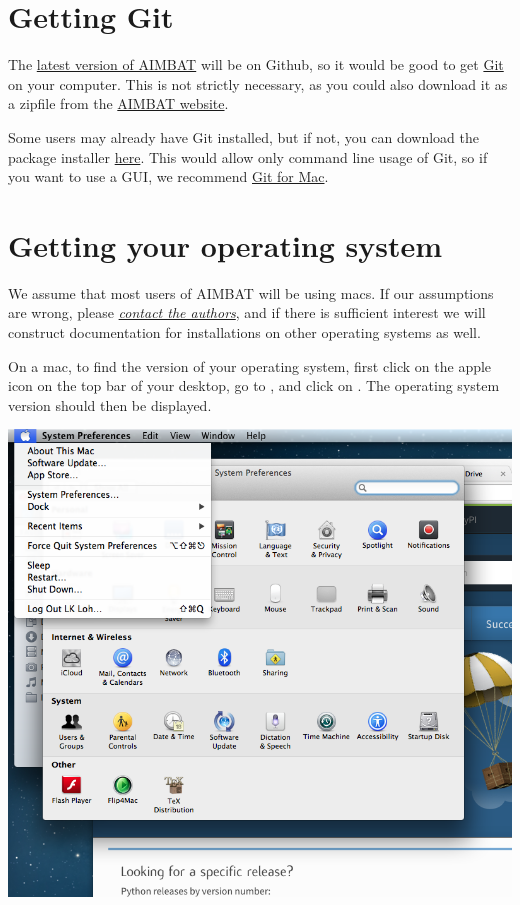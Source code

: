 \documentclass[letterpaper,10pt,english]{sphinxmanual}
\begin{document}
\section{Getting Git}
\label{docfiles/install_dependencies:getting-git}
The \href{https://github.com/pysmo}{latest version of AIMBAT} will be on Github, so it would be good to get \href{https://github.com/}{Git} on your computer. This is not strictly necessary, as you could also download it as a zipfile from the \href{http://www.earth.northwestern.edu/~xlou/aimbat.html}{AIMBAT website}.

Some users may already have Git installed, but if not, you can download the package installer \href{http://git-scm.com/download/mac}{here}. This would allow only command line usage of Git, so if you want to use a GUI, we recommend \href{https://mac.github.com/}{Git for Mac}.


\section{Getting your operating system}
\label{docfiles/install_dependencies:getting-your-operating-system}
We assume that most users of AIMBAT will be using macs. If our assumptions are wrong, please {\hyperref[docfiles/introduction:authors-contacts]{\emph{contact the authors}}}, and if there is sufficient interest we will construct documentation for installations on other operating systems as well.

On a mac, to find the version of your operating system, first click on the apple icon on the top bar of your desktop, go to , and click on . The operating system version should then be displayed.

\includegraphics{system_preferences.png}
\end{document}
